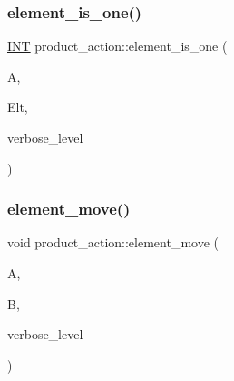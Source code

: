 \mbox{\label{classproduct__action_ab1c6c2798ca1b38b880b65c23a9c7d0f}} 
\subsubsection{\texorpdfstring{element\+\_\+is\+\_\+one()}{element\_is\_one()}}
{\footnotesize\ttfamily \mbox{\hyperlink{galois_8h_a09fddde158a3a20bd2dcadb609de11dc}{I\+NT}} product\+\_\+action\+::element\+\_\+is\+\_\+one (\begin{DoxyParamCaption}\item[{\mbox{\hyperlink{classaction}{action}} $\ast$}]{A,  }\item[{\mbox{\hyperlink{galois_8h_a09fddde158a3a20bd2dcadb609de11dc}{I\+NT}} $\ast$}]{Elt,  }\item[{\mbox{\hyperlink{galois_8h_a09fddde158a3a20bd2dcadb609de11dc}{I\+NT}}}]{verbose\+\_\+level }\end{DoxyParamCaption})}

\mbox{\label{classproduct__action_a050d5d2cdc731733429973f5a619cfeb}} 
\subsubsection{\texorpdfstring{element\+\_\+move()}{element\_move()}}
{\footnotesize\ttfamily void product\+\_\+action\+::element\+\_\+move (\begin{DoxyParamCaption}\item[{\mbox{\hyperlink{galois_8h_a09fddde158a3a20bd2dcadb609de11dc}{I\+NT}} $\ast$}]{A,  }\item[{\mbox{\hyperlink{galois_8h_a09fddde158a3a20bd2dcadb609de11dc}{I\+NT}} $\ast$}]{B,  }\item[{\mbox{\hyperlink{galois_8h_a09fddde158a3a20bd2dcadb609de11dc}{I\+NT}}}]{verbose\+\_\+level }\end{DoxyParamCaption})}

\mbox{\label{classproduct__action_a9305e43d88bef0395674839dea1f8ea6}} 
